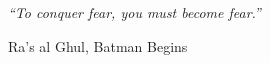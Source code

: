 

\pagestyle{empty}

\null\vfill

\textit{``To conquer fear, you must become fear.''}

\begin{flushright}
Ra's al Ghul, Batman Begins
\end{flushright}

\vfill\vfill\vfill\vfill\vfill\vfill\null
\clearpage
